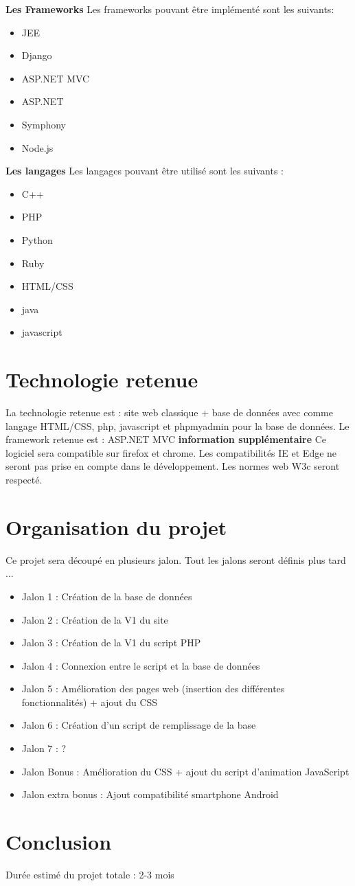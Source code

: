 \documentclass[12pt]{report}
\begin{document}
\textbf{Les Frameworks}
Les frameworks pouvant être implémenté sont les suivants: 
\begin{itemize}
	\item JEE
	\item Django
	\item ASP.NET MVC
	\item ASP.NET
	\item Symphony
	\item Node.js
\end{itemize}

\textbf{Les langages}
Les langages pouvant être utilisé sont les suivants : 
\begin{itemize}
	\item C++
	\item PHP
	\item Python
	\item Ruby
	\item HTML/CSS
	\item java
	\item javascript
\end{itemize}

\section{Technologie retenue}
La technologie retenue est : site web classique + base de données avec comme langage HTML/CSS, php, javascript et phpmyadmin pour la base de données.
Le framework retenue est : ASP.NET MVC
\textbf{information supplémentaire}
Ce logiciel sera compatible sur firefox et chrome. Les compatibilités IE et Edge ne seront pas prise en compte dans le développement.
Les normes web W3c seront respecté.

\section{Organisation du projet}
Ce projet sera découpé en plusieurs jalon.
Tout les jalons seront définis plus tard ...
\begin{itemize}
	\item Jalon 1 : Création de la base de données
	\item Jalon 2 : Création de la V1 du site
	\item Jalon 3 : Création de la V1 du script PHP
	\item Jalon 4 : Connexion entre le script et la base de données
	\item Jalon 5 : Amélioration des pages web (insertion des différentes fonctionnalités) + ajout du CSS
	\item Jalon 6 : Création d'un script de remplissage de la base
	\item Jalon 7 : ?
	\item Jalon Bonus : Amélioration du CSS + ajout du script d'animation JavaScript
	\item Jalon extra bonus : Ajout compatibilité smartphone Android
\end{itemize}

\section{Conclusion}
Durée estimé du projet totale : 2-3 mois
\end{document}
